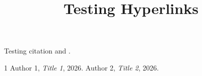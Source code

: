 \documentclass[conference]{IEEEtran}
\begin{document}
\title{Testing Hyperlinks}
\author{}
\maketitle

Testing citation \cite{ref1} and \cite{ref2}.

\begin{thebibliography}{1}
 Author 1, \emph{Title 1}, 2026.
 Author 2, \emph{Title 2}, 2026.
\end{thebibliography}
\end{document}
